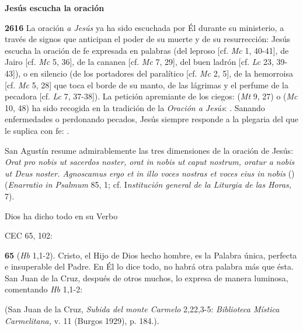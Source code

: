 \begin{body}
\begin{body}
\textbf{Jesús escucha la oración}

\textbf{2616} La oración \emph{a Jesús} ya ha sido escuchada por Él durante su ministerio, a través de signos que anticipan el poder de su muerte y de su resurrección: Jesús escucha la oración de fe expresada en palabras (del leproso {[}cf. \emph{Mc} 1, 40-41{]}, de Jairo {[}cf. \emph{Mc} 5, 36{]}, de la cananea {[}cf. \emph{Mc} 7, 29{]}, del buen ladrón {[}cf. \emph{Lc} 23, 39-43{]}), o en silencio (de los portadores del paralítico {[}cf. \emph{Mc} 2, 5{]}, de la hemorroisa {[}cf. \emph{Mc} 5, 28{]} que toca el borde de su manto, de las lágrimas y el perfume de la pecadora {[}cf. \emph{Lc} 7, 37-38{]}). La petición apremiante de los ciegos:  (\emph{Mt} 9, 27) o  (\emph{Mc} 10, 48) ha sido recogida en la tradición de la \emph{Oración a Jesús}: . Sanando enfermedades o perdonando pecados, Jesús siempre responde a la plegaria del que le suplica con fe: .

San Agustín resume admirablemente las tres dimensiones de la oración de Jesús: \emph{Orat pro nobis ut sacerdos noster, orat in nobis ut caput nostrum, oratur a nobis ut Deus noster. Agnoscamus ergo et in illo voces nostras et voces eius in nobis} () (\emph{Enarratio in Psalmum} 85, 1; cf. I\emph{nstitución general de la Liturgia de las Horas,} 7).

Dios ha dicho todo en su Verbo

CEC 65, 102:

\textbf{65}  (\emph{Hb} 1,1-2). Cristo, el Hijo de Dios hecho hombre, es la Palabra única, perfecta e insuperable del Padre. En Él lo dice todo, no habrá otra palabra más que ésta. San Juan de la Cruz, después de otros muchos, lo expresa de manera luminosa, comentando \emph{Hb} 1,1-2:

 (San Juan de la Cruz, \emph{Subida del monte Carmelo} 2,22,3-5: \emph{Biblioteca Mística Carmelitana,} v. 11 (Burgos 1929), p. 184.).


\end{body}
\end{body}
